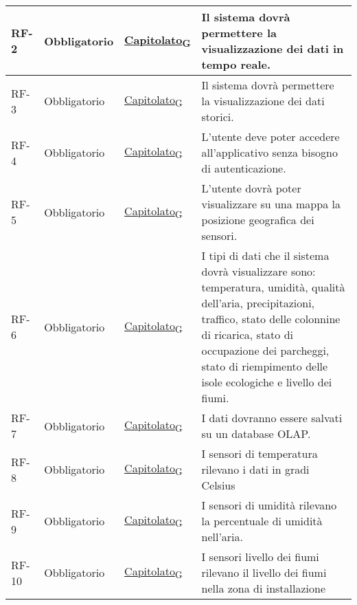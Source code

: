 \begin{longtable}{|>{\centering\arraybackslash}m{}|>{\centering\arraybackslash}m{}|>{\centering\arraybackslash}m{}|>{\centering\arraybackslash}m{}|}
	\\\hline
	RF-2            & Obbligatorio        & \href{https://7last.github.io/docs/pb/documentazione-interna/glossario\#capitolato}{Capitolato\textsubscript{G}} & Il sistema dovrà permettere la visualizzazione dei dati in tempo reale.
	\\\hline
	RF-3            & Obbligatorio        & \href{https://7last.github.io/docs/pb/documentazione-interna/glossario\#capitolato}{Capitolato\textsubscript{G}} & Il sistema dovrà permettere la visualizzazione dei dati storici.
	\\\hline
	RF-4            & Obbligatorio        & \href{https://7last.github.io/docs/pb/documentazione-interna/glossario\#capitolato}{Capitolato\textsubscript{G}} & L'utente deve poter accedere all'applicativo senza bisogno di autenticazione.
	\\\hline
	RF-5            & Obbligatorio        & \href{https://7last.github.io/docs/pb/documentazione-interna/glossario\#capitolato}{Capitolato\textsubscript{G}} & L'utente dovrà poter visualizzare su una mappa la posizione geografica dei sensori.
	\\\hline
	RF-6            & Obbligatorio        & \href{https://7last.github.io/docs/pb/documentazione-interna/glossario\#capitolato}{Capitolato\textsubscript{G}} & I tipi di dati che il sistema dovrà visualizzare sono: temperatura, umidità, qualità dell'aria, precipitazioni, traffico, stato delle colonnine di ricarica, stato di occupazione dei parcheggi, stato di riempimento delle isole ecologiche e livello dei fiumi.
	\\\hline
	RF-7            & Obbligatorio        & \href{https://7last.github.io/docs/pb/documentazione-interna/glossario\#capitolato}{Capitolato\textsubscript{G}} & I dati dovranno essere salvati su un database OLAP.
	\\\hline
	RF-8            & Obbligatorio        & \href{https://7last.github.io/docs/pb/documentazione-interna/glossario\#capitolato}{Capitolato\textsubscript{G}} & I sensori di temperatura rilevano i dati in gradi Celsius
	\\\hline
	RF-9            & Obbligatorio        & \href{https://7last.github.io/docs/pb/documentazione-interna/glossario\#capitolato}{Capitolato\textsubscript{G}} & I sensori di umidità rilevano la percentuale di umidità nell’aria.
	\\\hline
	RF-10           & Obbligatorio        & \href{https://7last.github.io/docs/pb/documentazione-interna/glossario\#capitolato}{Capitolato\textsubscript{G}} & I sensori livello dei fiumi rilevano il livello dei fiumi nella zona di installazione

\end{longtable}
